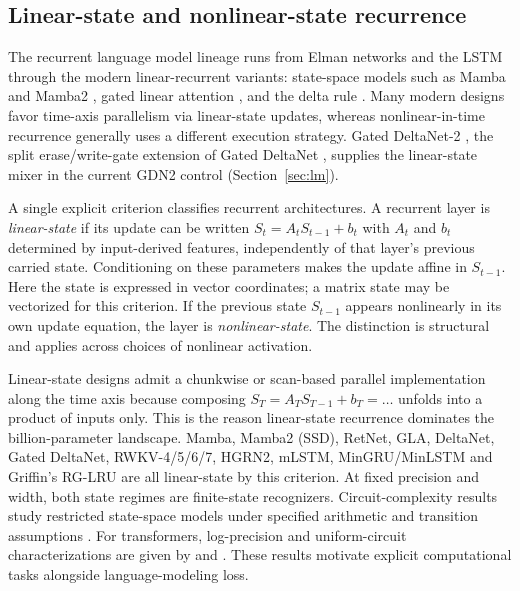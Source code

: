 \documentclass[10pt]{article}
\theoremstyle{canonical}
\theoremstyle{canonicalbullet}
\begin{document}
\subsection*{Linear-state and nonlinear-state recurrence}


The recurrent language model lineage runs from Elman networks \citep{elman1990} and the LSTM \citep{lstm1997} through the modern linear-recurrent variants: state-space models such as Mamba and Mamba2 \citep{mamba2024} \citep{mamba2_2024}, gated linear attention \citep{gla2023}, and the delta rule \citep{deltanet2024}. Many modern designs favor time-axis parallelism via linear-state updates, whereas nonlinear-in-time recurrence generally uses a different execution strategy. Gated DeltaNet-2 \citep{gated_deltanet2_2026}, the split erase/write-gate extension of Gated DeltaNet \citep{gated_deltanet2024}, supplies the linear-state mixer in the current GDN2 control (Section~\ref{sec:lm}).

A single explicit criterion classifies recurrent architectures. A recurrent layer is \emph{linear-state} if its update can be written ${S }_{t } =  {A }_{t } {S }_{t - 1} +  {b }_{t }$ with ${A }_{t }$ and ${b }_{t }$ determined by input-derived features, independently of that layer's previous carried state. Conditioning on these parameters makes the update affine in ${S }_{t - 1}$. Here the state is expressed in vector coordinates; a matrix state may be vectorized for this criterion. If the previous state ${S }_{t - 1}$ appears nonlinearly in its own update equation, the layer is \emph{nonlinear-state}. The distinction is structural and applies across choices of nonlinear activation.

Linear-state designs admit a chunkwise or scan-based parallel implementation along the time axis because composing ${S }_{T } =  {A }_{T } {S }_{T - 1} +  {b }_{T } =  \ldots $ unfolds into a product of inputs only. This is the reason linear-state recurrence dominates the billion-parameter landscape. Mamba, Mamba2 (SSD), RetNet, GLA, DeltaNet, Gated DeltaNet, RWKV-4/5/6/7, HGRN2, mLSTM, MinGRU/MinLSTM \citep{mingru_2024} and Griffin's RG-LRU \citep{griffin2024} are all linear-state by this criterion. At fixed precision and width, both state regimes are finite-state recognizers. Circuit-complexity results study restricted state-space models under specified arithmetic and transition assumptions \citep{merrill2024transformers}. For transformers, log-precision and uniform-circuit characterizations are given by \citep{merrill_sabharwal2023log_precision} and \citep{chiang2025uniform_tc0}. These results motivate explicit computational tasks alongside language-modeling loss.
\end{document}
